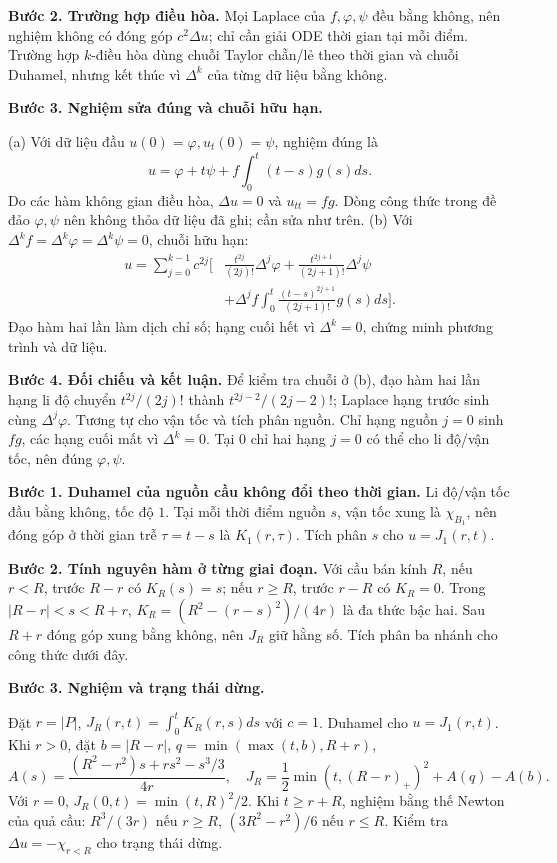 \textbf{Bước 2. Trường hợp điều hòa.} Mọi Laplace của $f,\varphi,\psi$ đều bằng không, nên nghiệm không có đóng góp $c^2\Delta u$; chỉ cần giải ODE thời gian tại mỗi điểm. Trường hợp $k$-điều hòa dùng chuỗi Taylor chẵn/lẻ theo thời gian và chuỗi Duhamel, nhưng kết thúc vì $\Delta^k$ của từng dữ liệu bằng không.

\textbf{Bước 3. Nghiệm sửa đúng và chuỗi hữu hạn.}

(a) Với dữ liệu đầu $u(0)=\varphi,u_t(0)=\psi$, nghiệm đúng là
\[u=\varphi+t\psi+f\int_0^t(t-s)g(s)ds.\]
Do các hàm không gian điều hòa, $\Delta u=0$ và $u_{tt}=fg$. Dòng công thức trong đề đảo $\varphi,\psi$ nên không thỏa dữ liệu đã ghi; cần sửa như trên.
(b) Với $\Delta^kf=\Delta^k\varphi=\Delta^k\psi=0$, chuỗi hữu hạn:
\begin{align*}
u=\sum_{j=0}^{k-1}c^{2j}\bigg[&\frac{t^{2j}}{(2j)!}\Delta^j\varphi+\frac{t^{2j+1}}{(2j+1)!}\Delta^j\psi\\
&+\Delta^jf\int_0^t\frac{(t-s)^{2j+1}}{(2j+1)!}g(s)ds\bigg].
\end{align*}
Đạo hàm hai lần làm dịch chỉ số; hạng cuối hết vì $\Delta^k=0$, chứng minh phương trình và dữ liệu.

\textbf{Bước 4. Đối chiếu và kết luận.} Để kiểm tra chuỗi ở (b), đạo hàm hai lần hạng li độ chuyển $t^{2j}/(2j)!$ thành $t^{2j-2}/(2j-2)!$; Laplace hạng trước sinh cùng $\Delta^j\varphi$. Tương tự cho vận tốc và tích phân nguồn. Chỉ hạng nguồn $j=0$ sinh $fg$, các hạng cuối mất vì $\Delta^k=0$. Tại $0$ chỉ hai hạng $j=0$ có thể cho li độ/vận tốc, nên đúng $\varphi,\psi$.

\textbf{Bước 1. Duhamel của nguồn cầu không đổi theo thời gian.} Li độ/vận tốc đầu bằng không, tốc độ $1$. Tại mỗi thời điểm nguồn $s$, vận tốc xung là $\chi_{B_1}$, nên đóng góp ở thời gian trễ $\tau=t-s$ là $K_1(r,\tau)$. Tích phân $s$ cho $u=J_1(r,t)$.

\textbf{Bước 2. Tính nguyên hàm ở từng giai đoạn.} Với cầu bán kính $R$, nếu $r<R$, trước $R-r$ có $K_R(s)=s$; nếu $r\ge R$, trước $r-R$ có $K_R=0$. Trong $|R-r|<s<R+r$, $K_R=(R^2-(r-s)^2)/(4r)$ là đa thức bậc hai. Sau $R+r$ đóng góp xung bằng không, nên $J_R$ giữ hằng số. Tích phân ba nhánh cho công thức dưới đây.

\textbf{Bước 3. Nghiệm và trạng thái dừng.}

Đặt $r=|P|$, $J_R(r,t)=\int_0^tK_R(r,s)ds$ với $c=1$. Duhamel cho $u=J_1(r,t)$. Khi $r>0$, đặt $b=|R-r|$, $q=\min(\max(t,b),R+r)$,
\[A(s)=\frac{(R^2-r^2)s+rs^2-s^3/3}{4r},\quad J_R=\frac12\min(t,(R-r)_+)^2+A(q)-A(b).\]
Với $r=0$, $J_R(0,t)=\min(t,R)^2/2$. Khi $t\ge r+R$, nghiệm bằng thế Newton của quả cầu: $R^3/(3r)$ nếu $r\ge R$, $(3R^2-r^2)/6$ nếu $r\le R$. Kiểm tra $\Delta u=-\chi_{r<R}$ cho trạng thái dừng.

